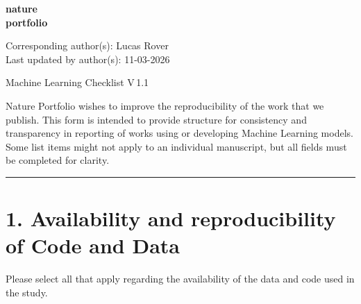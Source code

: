 \documentclass[11pt]{article}
\begin{document}
\begin{flushright}
{\large\bfseries\color{black!70} nature\\portfolio}
\end{flushright}

\noindent Corresponding author(s): Lucas Rover\\
Last updated by author(s): 11-03-2026

\begin{center}
{\LARGE Machine Learning Checklist \normalsize V\,1.1}
\end{center}

\noindent Nature Portfolio wishes to improve the reproducibility of the work that we publish. This form is intended to provide structure for consistency and transparency in reporting of works using or developing Machine Learning models. Some list items might not apply to an individual manuscript, but all fields must be completed for clarity.

\bigskip
\hrule
\bigskip

\section*{1. Availability and reproducibility of Code and Data}

\noindent Please select all that apply regarding the availability of the data and code used in the study.
\end{document}
